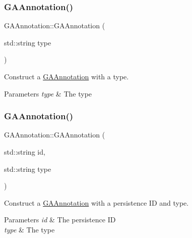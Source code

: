 \subsubsection{\texorpdfstring{G\+A\+Annotation()}{GAAnnotation()}\hspace{0.1cm}{\footnotesize\ttfamily [1/3]}}
{\footnotesize\ttfamily G\+A\+Annotation\+::\+G\+A\+Annotation (\begin{DoxyParamCaption}\item[{std\+::string}]{type }\end{DoxyParamCaption})}



Construct a \hyperlink{class_g_a_annotation}{G\+A\+Annotation} with a type. 


\begin{DoxyParams}{Parameters}
{\em type} & The type \\
\hline
\end{DoxyParams}
\mbox{\label{class_g_a_annotation_aa901f786bad351fe2bf19c734e6c3c92}} 
\subsubsection{\texorpdfstring{G\+A\+Annotation()}{GAAnnotation()}\hspace{0.1cm}{\footnotesize\ttfamily [2/3]}}
{\footnotesize\ttfamily G\+A\+Annotation\+::\+G\+A\+Annotation (\begin{DoxyParamCaption}\item[{std\+::string}]{id,  }\item[{std\+::string}]{type }\end{DoxyParamCaption})}



Construct a \hyperlink{class_g_a_annotation}{G\+A\+Annotation} with a persistence ID and type. 


\begin{DoxyParams}{Parameters}
{\em id} & The persistence ID \\
\hline
{\em type} & The type \\
\hline
\end{DoxyParams}
\mbox{\label{class_g_a_annotation_ae254750729165778f74a3d0313305eae}} 
